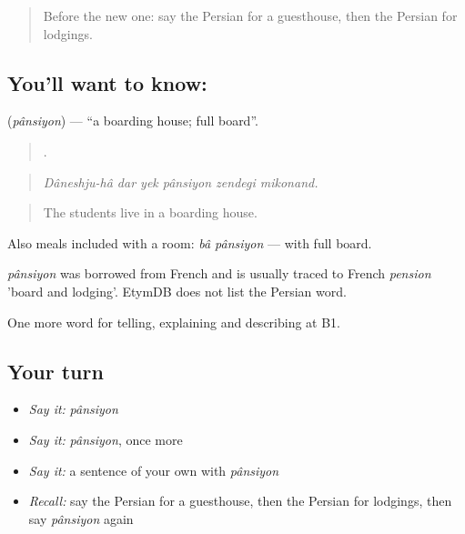 \label{lesson:FA-C437-pansiyon}



\begin{quote}
Before the new one: say the Persian for a guesthouse, then the Persian for lodgings.
\end{quote}

\subsection*{You'll want to know: }
\textbf{} (\emph{pânsiyon}) — \textquotedblleft{}a boarding house; full board\textquotedblright{}.

\begin{quote}
     .
\end{quote}

\begin{quote}
\emph{Dâneshju-hâ dar yek pânsiyon zendegi mikonand.}
\end{quote}

\begin{quote}
The students live in a boarding house.
\end{quote}

Also meals included with a room: \emph{bâ pânsiyon} — with full board.

\begin{cousinweb}
\emph{pânsiyon} was borrowed from French and is usually traced to French \emph{pension} 'board and lodging'. EtymDB does not list the Persian word.
\end{cousinweb}

\begin{grammarlens}[title={What you've built}]
One more word for telling, explaining and describing at B1.
\end{grammarlens}

\subsection*{Your turn}
\begin{itemize}
\raggedright
  \item \emph{Say it:} \emph{pânsiyon}
  \item \emph{Say it:} \emph{pânsiyon}, once more
  \item \emph{Say it:} a sentence of your own with \emph{pânsiyon}
  \item \emph{Recall:} say the Persian for a guesthouse, then the Persian for lodgings, then say \emph{pânsiyon} again
\end{itemize}

